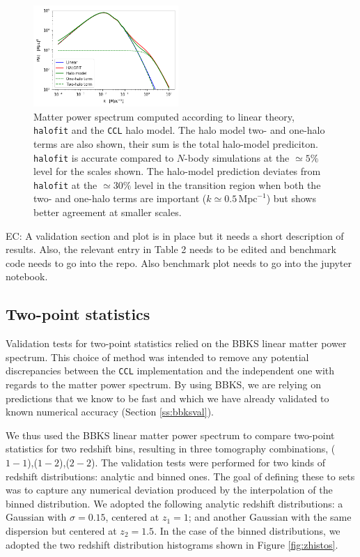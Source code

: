 \documentclass[\docopts]{\docclass}
\newcommand{\elisa}[1]{\textcolor{green!10!orange!90!}{EC: #1}}
\newcommand{\ccl}{{\tt CCL}\xspace}
\newcommand{\halofit}{{\tt halofit}\xspace}
\begin{document}
\begin{figure}
\includegraphics[width=0.49\textwidth]{halo_model.png}
\caption{Matter power spectrum computed according to linear theory, \halofit and the \ccl halo model. The halo model two- and one-halo terms are also shown, their sum is the total halo-model prediciton. \halofit is accurate compared to $N$-body simulations at the $\simeq5\%$ level for the scales shown. The halo-model prediction deviates from \halofit at the $\simeq30\%$ level in the transition region when both the two- and one-halo terms are important ($k\simeq0.5\,\mathrm{Mpc}^{-1}$) but shows better agreement at smaller scales.}
\label{fig:halo_model}
\end{figure}

\elisa{A validation section and plot is in place but it needs a short description of results. Also, the relevant entry in Table 2 needs to be edited and benchmark code needs to go into the repo. Also benchmark plot needs to go into the jupyter notebook.}

\subsection{Two-point statistics}

Validation tests for two-point statistics relied on the BBKS linear matter power spectrum. This choice of method was intended to remove any potential discrepancies between the \ccl implementation and the independent one with regards to the matter power spectrum. By using BBKS, we are relying on predictions that we know to be fast and which we have already validated to known numerical accuracy (Section \ref{ss:bbksval}).

We thus used the BBKS linear matter power spectrum to compare two-point statistics for two redshift bins, resulting in three tomography combinations, ($1-1$),($1-2$),($2-2$). The validation tests were performed for two kinds of redshift distributions: analytic and binned ones. The goal of defining these to sets was to capture any numerical deviation produced by the interpolation of the binned distribution. We adopted the following analytic redshift distributions: a Gaussian with $\sigma = 0.15$, centered at $z_1 = 1$; and another Gaussian with the same dispersion but centered at $z_2 = 1.5$. In the case of the binned distributions, we adopted the two redshift distribution histograms shown in Figure \ref{fig:zhistos}.
\end{document}
